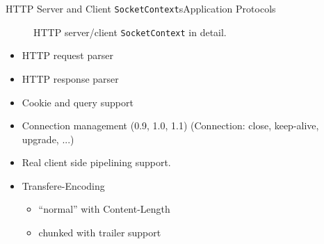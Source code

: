 \begin{frame}{HTTP Server and Client \texttt{SocketContext}s}{Application Protocols}
\begin{center}
\begin{figure}
    \caption{HTTP server/client \texttt{SocketContext} in detail.}
  \end{figure}
  \end{center}\begin{itemize}
     \item HTTP \alert{request parser}
     \item HTTP \alert{response parser}
     \item \alert{Cookie} and \alert{query} support
     \item Connection management (0.9, 1.0, 1.1) (Connection: close, keep-alive, upgrade, ...)
     \item Real client side \alert{pipelining} support.
     \item Transfere-Encoding
      \begin{itemize}
        \item "`normal"' with Content-Length
        \item \alert{chunked} with \alert{trailer} support
      \end{itemize}
   \end{itemize}
\end{frame}
